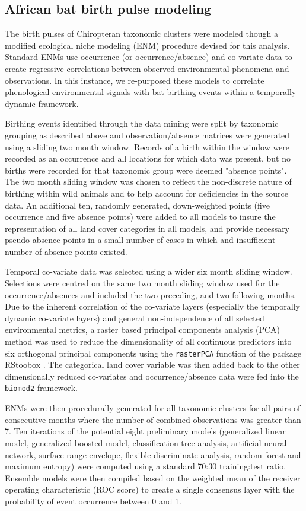 \documentclass[9pt,twoside,lineno]{pnas-new}
\begin{document}
\subsection*{African bat birth pulse modeling}
\label{biomod}
The birth pulses of Chiropteran taxonomic clusters were modeled though a modified ecological niche modeling (ENM) procedure devised for this analysis. Standard ENMs use occurrence (or occurrence/absence) and co-variate data to create regressive correlations between observed environmental phenomena and observations. In this instance, we re-purposed these models to correlate phenological environmental signals with bat birthing events within a temporally dynamic framework.\par
Birthing events identified through the data mining were split by taxonomic grouping as described above and observation/absence matrices were generated using a sliding two month window. Records of a birth within the window were recorded as an occurrence and all locations for which data was present, but no births were recorded for that taxonomic group were deemed "absence points". The two month sliding window was chosen to reflect the non-discrete nature of birthing within wild animals and to help account for deficiencies in the source data. An additional ten, randomly generated, down-weighted points (five occurrence and five absence points) were added to all models to insure the representation of all land cover categories in all models, and provide necessary pseudo-absence points in a small number of cases in which and insufficient number of absence points existed.\par
Temporal co-variate data was selected using a wider six month sliding window. Selections were centred on the same two month sliding window used for the occurrence/absences and included the two preceding, and two following months. Due to the inherent correlation of the co-variate layers (especially the temporally dynamic co-variate layers) and general non-independence of all selected environmental metrics, a raster based principal components analysis (PCA) method was used to reduce the dimensionality of all continuous predictors into six orthogonal principal components using the \texttt{rasterPCA} function of the package RStoobox \cite{Leutner2017RStoolbox:Analysis}. The categorical land cover variable was then added back to the other dimensionally reduced co-variates and occurrence/absence data were fed into the \texttt{biomod2}\cite{Thuiller2017Biomod2:Modeling} framework.\par
ENMs were then procedurally generated for all taxonomic clusters for all pairs of consecutive months where the number of combined observations was greater than 7. Ten iterations of the potential eight preliminary models (generalized linear model, generalized boosted model, classification tree analysis, artificial neural network, surface range envelope, flexible discriminate analysis, random forest and maximum entropy) were computed using a standard 70:30 training:test ratio. Ensemble models were then compiled based on the weighted mean of the receiver operating characteristic (ROC score) to create a single consensus layer with the probability of event occurrence between 0 and 1.\par
\end{document}
